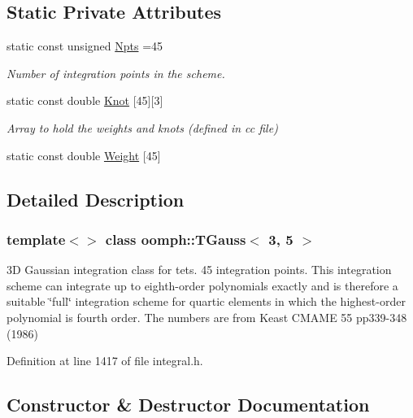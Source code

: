 \subsection*{Static Private Attributes}
\begin{DoxyCompactItemize}
\item 
static const unsigned \hyperlink{classoomph_1_1TGauss_3_013_00_015_01_4_a24395831f6818cf1fbd9c5234d3026c2}{Npts} =45
\begin{DoxyCompactList}\small\item\em Number of integration points in the scheme. \end{DoxyCompactList}\item 
static const double \hyperlink{classoomph_1_1TGauss_3_013_00_015_01_4_a456a59024af9e0fa18b05fe8c63197e7}{Knot} \mbox{[}45\mbox{]}\mbox{[}3\mbox{]}
\begin{DoxyCompactList}\small\item\em Array to hold the weights and knots (defined in cc file) \end{DoxyCompactList}\item 
static const double \hyperlink{classoomph_1_1TGauss_3_013_00_015_01_4_a98442d62e5713d76f54adfd7f567bebb}{Weight} \mbox{[}45\mbox{]}
\end{DoxyCompactItemize}


\subsection{Detailed Description}
\subsubsection*{template$<$$>$\newline
class oomph\+::\+T\+Gauss$<$ 3, 5 $>$}

3D Gaussian integration class for tets. 45 integration points. This integration scheme can integrate up to eighth-\/order polynomials exactly and is therefore a suitable \char`\"{}full\char`\"{} integration scheme for quartic elements in which the highest-\/order polynomial is fourth order. The numbers are from Keast C\+M\+A\+ME 55 pp339-\/348 (1986) 

Definition at line 1417 of file integral.\+h.



\subsection{Constructor \& Destructor Documentation}
\mbox{\label{classoomph_1_1TGauss_3_013_00_015_01_4_af074d994928e010d4ac1fab63eef1e68}} 
